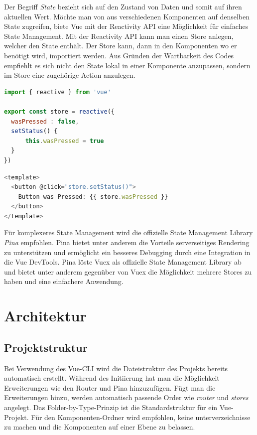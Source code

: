 Der Begriff \emph{State} bezieht sich auf den Zustand von Daten und somit auf ihren aktuellen Wert.
Möchte man von aus verschiedenen Komponenten auf denselben State zugreifen,
biete Vue mit der Reactivity API eine Möglichkeit für einfaches State Management.
Mit der Reactivity API kann man einen Store anlegen, welcher den State enthält.
Der Store kann, dann in den Komponenten wo er benötigt wird, importiert werden.
Aus Gründen der Wartbarkeit des Codes empfiehlt es sich nicht den State lokal in einer Komponente anzupassen,
sondern im Store eine zugehörige Action anzulegen. \cite{vueStateManagement}

\begin{lstlisting}[caption={Anlegen eines Stores mit Reactivity API},language=javascript,label={lst:Anlegen-Store}]
import { reactive } from 'vue'

export const store = reactive({
  wasPressed : false,
  setStatus() {
      this.wasPressed = true
  }
})
\end{lstlisting}

\begin{lstlisting}[caption={Vewendung des Stores},language=javascript,label={lst:Verwendung-Store}]
<template>
  <button @click="store.setStatus()">
    Button was Pressed: {{ store.wasPressed }}
  </button>
</template>
\end{lstlisting}

Für komplexeres State Management wird die offizielle State Management Library \emph{Pina} empfohlen.
Pina bietet unter anderem die Vorteile serverseitiges Rendering zu unterstützen und
ermöglicht ein besseres Debugging durch eine Integration in die Vue DevTools.
Pina löste Vuex als offizielle State Management Library ab und bietet unter anderem gegenüber von Vuex
die Möglichkeit mehrere Stores zu haben und eine einfachere Anwendung.  \cite{vueStateManagement}

\section{Architektur}

\subsection*{Projektstruktur}
Bei Verwendung des Vue-CLI wird die Dateistruktur des Projekts bereits automatisch erstellt.
Während des Initiierung hat man die Möglichkeit Erweiterungen wie den Router und Pina hinzuzufügen.
Fügt man die Erweiterungen hinzu, werden automatisch passende Order wie \emph{router} und \emph{stores} angelegt.
Das Folder-by-Type-Prinzip ist die Standardstruktur für ein Vue-Projekt.
Für den Komponenten-Ordner wird empfohlen, keine unterverzeichnisse zu machen und
die Komponenten auf einer Ebene zu belassen. \cite{largeScaleVue}

